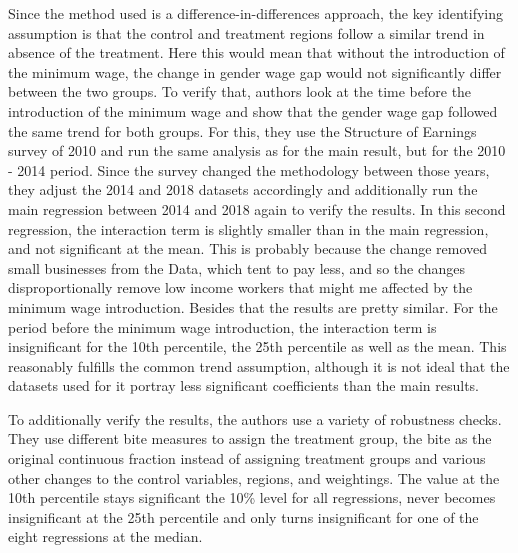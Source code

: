 \documentclass[12pt,draft,a4paper]{article}
\begin{document}
Since the method used is a difference-in-differences approach, the key identifying assumption is that the control and treatment regions follow a similar trend in absence of the treatment.
Here this would mean that without the introduction of the minimum wage,
the change in gender wage gap would not significantly differ between the two groups.
To verify that, authors look at the time before the introduction of the minimum wage and
show that the gender wage gap followed the same trend for both groups.
For this, they use the Structure of Earnings survey of 2010 and run the same analysis as for the main result,
but for the 2010 - 2014 period. Since the survey changed the methodology between those years, they adjust the 2014 and 2018 datasets accordingly and additionally run the main regression between 2014 and 2018 again to verify the results.
In this second regression, the interaction term is slightly smaller than in the main regression,
and not significant at the mean. This is probably because the change removed small businesses from the Data, which tent to pay less, and so the changes disproportionally remove low income workers that might me affected by the minimum wage introduction. Besides that the results are pretty similar.
For the period before the minimum wage introduction, the interaction term is insignificant for the 10th percentile, the 25th percentile as well as the mean. This reasonably fulfills the common trend assumption,
although it is not ideal that the datasets used for it portray less significant coefficients than the main results.

To additionally verify the results, the authors use a variety of robustness checks. 
They use different bite measures to assign the treatment group, the bite as the original continuous fraction instead of assigning treatment groups and various other changes to the control variables, regions, and weightings.
The value at the 10th percentile stays significant the 10\% level for all regressions, never becomes insignificant at the 25th percentile and only turns insignificant for one of the eight regressions at the median. 
\end{document}
